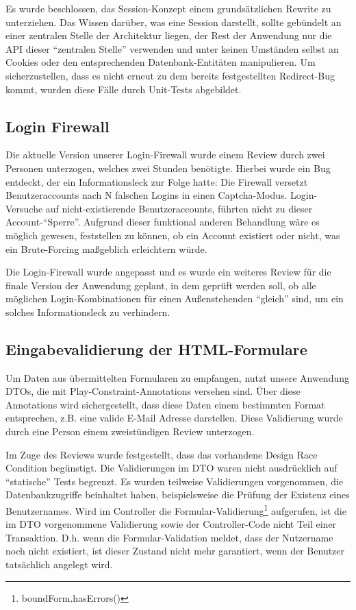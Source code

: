 \documentclass[12pt,DIV14,BCOR10mm,a4paper,parskip=half-,headsepline,headinclude,english,ngerman,bibliography=totocnumbered]{scrreprt}
\begin{document}
Es wurde beschlossen, das Session-Konzept einem grundsätzlichen Rewrite zu unterziehen. Das Wissen darüber, was eine Session darstellt, sollte gebündelt an einer zentralen Stelle der Architektur liegen, der Rest der Anwendung nur die API dieser \enquote{zentralen Stelle} verwenden und unter keinen Umständen selbst an Cookies oder den entsprechenden Datenbank-Entitäten manipulieren. Um sicherzustellen, dass es nicht erneut zu dem bereits festgestellten Redirect-Bug kommt, wurden diese Fälle durch Unit-Tests abgebildet.

\subsection{Login Firewall}
Die aktuelle Version unserer Login-Firewall wurde einem Review durch zwei Personen unterzogen, welches zwei Stunden benötigte. Hierbei wurde ein Bug entdeckt, der ein Informationsleck zur Folge hatte: Die Firewall versetzt Benutzeraccounts nach N falschen Logins in einen Captcha-Modus. Login-Versuche auf nicht-existierende Benutzeraccounts, führten nicht zu dieser Account-\enquote{Sperre}. Aufgrund dieser funktional anderen Behandlung wäre es möglich gewesen, feststellen zu können, ob ein Account existiert oder nicht, was ein Brute-Forcing maßgeblich erleichtern würde.

Die Login-Firewall wurde angepasst und es wurde ein weiteres Review für die finale Version der Anwendung geplant, in dem geprüft werden soll, ob alle möglichen Login-Kombinationen für einen Außenstehenden \enquote{gleich} sind, um ein solches Informationsleck zu verhindern.

\subsection{Eingabevalidierung der HTML-Formulare}
Um Daten aus übermittelten Formularen zu empfangen, nutzt unsere Anwendung DTOs, die mit Play-Constraint-Annotations versehen sind. Über diese Annotations wird sichergestellt, dass diese Daten einem bestimmten Format entsprechen, z.B. eine valide E-Mail Adresse darstellen. Diese Validierung wurde durch eine Person einem zweistündigen Review unterzogen.

Im Zuge des Reviews wurde festgestellt, dass das vorhandene Design Race Condition begünstigt. Die Validierungen im DTO waren nicht ausdrücklich auf \enquote{statische} Tests begrenzt. Es wurden teilweise Validierungen vorgenommen, die Datenbankzugriffe beinhaltet haben, beispielsweise die Prüfung der Existenz eines Benutzernames. Wird im Controller die Formular-Validierung\footnote{boundForm.hasErrors()} aufgerufen, ist die im DTO vorgenommene Validierung sowie der Controller-Code nicht Teil einer Transaktion. D.h. wenn die Formular-Validation meldet, dass der Nutzername noch nicht existiert, ist dieser Zustand nicht mehr garantiert, wenn der Benutzer tatsächlich angelegt wird.
\end{document}
